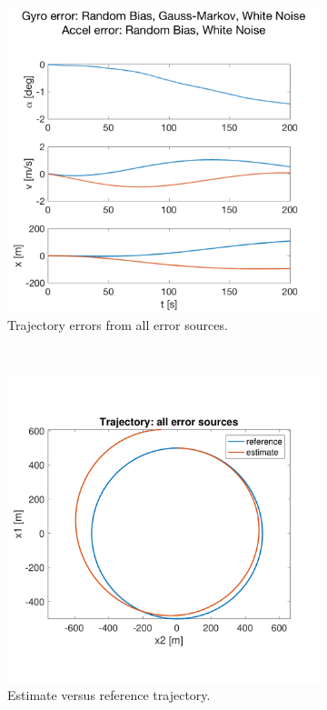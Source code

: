 \documentclass{article}
\begin{document}
\begin{figure}[H]
    \centering
    \begin{subfigure}[t]{0.49\textwidth}
        \centering
        \includegraphics[width=\textwidth]{fig/all}
        \caption{Trajectory errors from all error sources.}
    \end{subfigure}
    ~
    \begin{subfigure}[t]{0.49\textwidth}
        \centering
        \includegraphics[width=\textwidth]{fig/traj_all}
        \caption{Estimate versus reference trajectory.}
    \end{subfigure}
    \caption{}
    \label{fig:error_all}
\end{figure}
\end{document}
